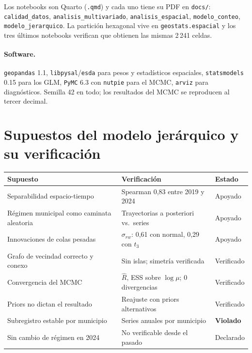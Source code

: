 \documentclass[11pt,a4paper]{article}
\newcommand{\Rhat}{\hat{R}}
\begin{document}
Los notebooks son Quarto (\texttt{.qmd}) y cada uno tiene su PDF en
\texttt{docs/}: \texttt{calidad\_datos}, \texttt{analisis\_multivariado},
\texttt{analisis\_espacial}, \texttt{modelo\_conteo}, \texttt{modelo\_jerarquico}.
La partición hexagonal vive en \texttt{geostats.espacial} y los tres últimos
notebooks verifican que obtienen las mismas 2\,241 celdas.

\paragraph{Software.} \texttt{geopandas} 1.1, \texttt{libpysal}/\texttt{esda}
para pesos y estadísticos espaciales, \texttt{statsmodels} 0.15 para los GLM,
\texttt{PyMC} 6.3 con \texttt{nutpie} para el MCMC, \texttt{arviz} para
diagnósticos. Semilla 42 en todo; los resultados del MCMC se reproducen al
tercer decimal.

\section{Supuestos del modelo jerárquico y su verificación}

\begin{table}[H]
\centering\small
\begin{tabular}{p{4.4cm}p{6.2cm}p{2.6cm}}
\toprule
Supuesto & Verificación & Estado \\
\midrule
Separabilidad espacio-tiempo & Spearman 0,83 entre 2019 y 2024 & Apoyado \\
Régimen municipal como caminata aleatoria & Trayectorias a posteriori vs.\ series & Apoyado \\
Innovaciones de colas pesadas & $\sigma_{rw}$: 0,61 con normal, 0,29 con $t_3$ & Apoyado \\
Grafo de vecindad correcto y conexo & Sin islas; simetría verificada & Verificado \\
Convergencia del MCMC & $\Rhat$, ESS sobre $\log\mu$; 0 divergencias & Verificado \\
Priors no dictan el resultado & Reajuste con priors alternativos & Verificado \\
Subregistro estable por municipio & Series anuales por municipio & \textbf{Violado} \\
Sin cambio de régimen en 2024 & No verificable desde el pasado & Declarado \\
\bottomrule
\end{tabular}
\end{table}
\end{document}
